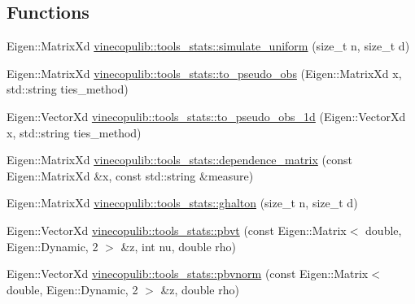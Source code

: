 \subsection*{Functions}
\begin{DoxyCompactItemize}
\item 
Eigen\+::\+Matrix\+Xd \hyperlink{namespacevinecopulib_1_1tools__stats_a78efaf3caf538201cdb881dd2780b242}{vinecopulib\+::tools\+\_\+stats\+::simulate\+\_\+uniform} (size\+\_\+t n, size\+\_\+t d)
\item 
Eigen\+::\+Matrix\+Xd \hyperlink{namespacevinecopulib_1_1tools__stats_afda41507cee7cba84602e28e56cfcd99}{vinecopulib\+::tools\+\_\+stats\+::to\+\_\+pseudo\+\_\+obs} (Eigen\+::\+Matrix\+Xd x, std\+::string ties\+\_\+method)
\item 
Eigen\+::\+Vector\+Xd \hyperlink{namespacevinecopulib_1_1tools__stats_a9e4849a2a908703a68e92e0c0633237f}{vinecopulib\+::tools\+\_\+stats\+::to\+\_\+pseudo\+\_\+obs\+\_\+1d} (Eigen\+::\+Vector\+Xd x, std\+::string ties\+\_\+method)
\item 
Eigen\+::\+Matrix\+Xd \hyperlink{namespacevinecopulib_1_1tools__stats_ae2eca8e0fc4ac2d7eeb0226845214847}{vinecopulib\+::tools\+\_\+stats\+::dependence\+\_\+matrix} (const Eigen\+::\+Matrix\+Xd \&x, const std\+::string \&measure)
\item 
Eigen\+::\+Matrix\+Xd \hyperlink{namespacevinecopulib_1_1tools__stats_ae0ba8000d0941c82677df06ce6d1d564}{vinecopulib\+::tools\+\_\+stats\+::ghalton} (size\+\_\+t n, size\+\_\+t d)
\item 
Eigen\+::\+Vector\+Xd \hyperlink{namespacevinecopulib_1_1tools__stats_a1e81bac0b4e1e9e0158b800a7db0d1af}{vinecopulib\+::tools\+\_\+stats\+::pbvt} (const Eigen\+::\+Matrix$<$ double, Eigen\+::\+Dynamic, 2 $>$ \&z, int nu, double rho)
\item 
Eigen\+::\+Vector\+Xd \hyperlink{namespacevinecopulib_1_1tools__stats_a6867eea2d193c7e5d78b30b9991397ad}{vinecopulib\+::tools\+\_\+stats\+::pbvnorm} (const Eigen\+::\+Matrix$<$ double, Eigen\+::\+Dynamic, 2 $>$ \&z, double rho)
\end{DoxyCompactItemize}
